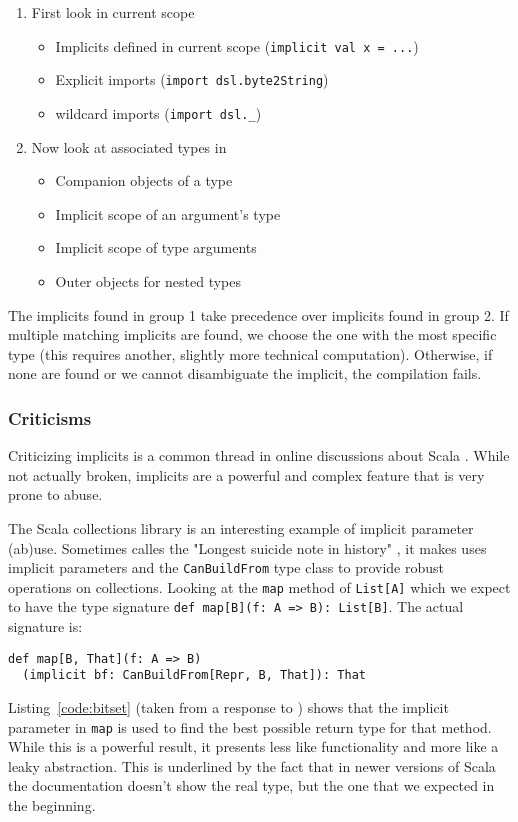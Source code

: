 \begin{enumerate}
	\item First look in current scope
	\begin{itemize}
		\item Implicits defined in current scope (\texttt{implicit val x = ...})
    \item Explicit imports (\texttt{import dsl.byte2String})
    \item wildcard imports (\texttt{import dsl.\_})
	\end{itemize}
	\item Now look at associated types in
	\begin{itemize}
		\item Companion objects of a type
		\item Implicit scope of an argument’s type
		\item Implicit scope of type arguments
		\item Outer objects for nested types
	\end{itemize}
\end{enumerate}

The implicits found in group 1 take precedence over implicits found in group 2.
If multiple matching implicits are found, we choose the one with the most specific type (this requires another, slightly more technical computation).
Otherwise, if none are found or we cannot disambiguate the implicit, the compilation fails.

\subsubsection{Criticisms}

Criticizing implicits is a common thread in online discussions about Scala \autocite{Plush:2015, lakes:2009, Allan:2013, Hale:2011}.
While not actually broken, implicits are a powerful and complex feature that is very prone to abuse.

The Scala collections library is an interesting example of implicit parameter (ab)use.
Sometimes calles the "Longest suicide note in history" \autocite{lakes:2009}, it makes uses implicit parameters and the \texttt{CanBuildFrom} type class to provide robust operations on collections.
Looking at the \texttt{map} method of \texttt{List[A]} which we expect to have the type signature \texttt{def map[B](f: A => B): List[B]}.
The actual signature is:
\begin{verbatim}
def map[B, That](f: A => B)
  (implicit bf: CanBuildFrom[Repr, B, That]): That
\end{verbatim}
Listing~\ref{code:bitset} (taken from a response to \autocite{lakes:2009}) shows that the implicit parameter in \texttt{map} is used to find the best possible return type for that method.
While this is a powerful result, it presents less like functionality and more like a leaky abstraction.
This is underlined by the fact that in newer versions of Scala the documentation doesn't show the real type, but the one that we expected in the beginning.

